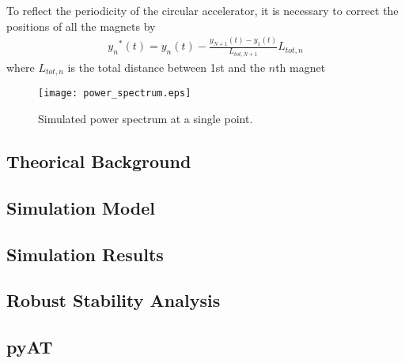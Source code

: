 To reflect the periodicity of the circular accelerator, it is necessary to correct the positions of all the magnets by 
\begin{align} 
   {y_n}^*(t) = y_n(t) - \frac{y_{N+1}(t) - y_1(t)}{L_{tot, N+1}}L_{tot, n}
\end{align}
where $L_{tot, n}$ is the total distance between 1st and the $n$th magnet

\begin{figure}
    \begin{center}
        \texttt{[image: power\_spectrum.eps]}
    \end{center}
    \caption{Simulated power spectrum at a single point.}
    \label{fig:power_spectrum}
\end{figure}

\subsection{Theorical Background}

\subsection{Simulation Model}

\subsection{Simulation Results}

\subsection{Robust Stability Analysis}

\subsection{pyAT}
